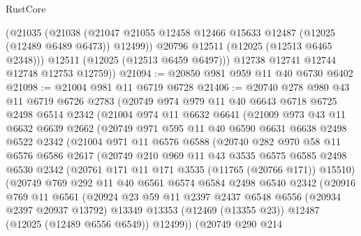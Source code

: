 \begin{lexlean}{RustCore}
\begin{coremodule}
          (@21035
            (@21038
              (@21047 @21055 @12458 @12466 @15633 @12487 (@12025 (@12489 @6489 @6473)) @12499))
            @20796
            @12511
            (@12025 (@12513 @6465 @2348)))
          @12511
          (@12025 (@12513 @6459 @6497)))
        @12738
        @12741
        @12744
        @12748
        @12753
        @12759))
@21094 := @20850 @981 @959 @11 @40 @6730 @6402
@21098 := @21004 @981 @11 @6719 @6728
@21406 := @20740
    @278
    @980
    @43
    @11
    @6719
    @6726
    @2783
    (@20749
      @974
      @979
      @11
      @40
      @6643
      @6718
      @6725
      @2498
      @6514
      @2342
      (@21004
        @974
        @11
        @6632
        @6641
        (@21009
          @973
          @43
          @11
          @6632
          @6639
          @2662
          (@20749
            @971
            @595
            @11
            @40
            @6590
            @6631
            @6638
            @2498
            @6522
            @2342
            (@21004
              @971
              @11
              @6576
              @6588
              (@20740
                @282
                @970
                @58
                @11
                @6576
                @6586
                @2617
                (@20749
                  @210
                  @969
                  @11
                  @43
                  @3535
                  @6575
                  @6585
                  @2498
                  @6530
                  @2342
                  (@20761 @171 @11 @171 @3535 (@11765 (@20766 @171)) @15510)
                  (@20749
                    @769
                    @292
                    @11
                    @40
                    @6561
                    @6574
                    @6584
                    @2498
                    @6540
                    @2342
                    (@20916
                      @769
                      @11
                      @6561
                      (@20924
                        @23
                        @59
                        @11
                        @2397
                        @2437
                        @6548
                        @6556
                        (@20934 @2397 @20937 @13792)
                        @13349
                        @13353
                        (@12469 (@13355 @23))
                        @12487
                        (@12025 (@12489 @6556 @6549))
                        @12499))
                    (@20749
                      @290
                      @214

\end{coremodule}
\end{lexlean}
